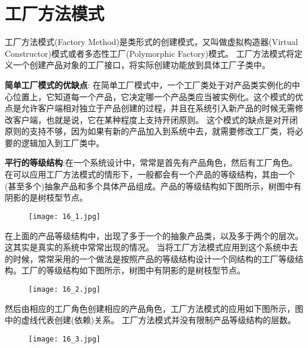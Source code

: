 \documentclass[../main.tex]{subfiles}
\begin{document}
\section{工厂方法模式}
工厂方法模式(Factory Method)是类形式的创建模式，又叫做虚拟构造器(Virtual Constructor)模式或者多态性工厂(Polymorphic Factory)模式。
工厂方法模式将定义一个创建产品对象的工厂接口，将实际创建功能放到具体工厂子类中。

\textbf{简单工厂模式的优缺点}:
在简单工厂模式中，一个工厂类处于对产品类实例化的中心位置上，它知道每一个产品，它决定哪一个产品类应当被实例化。这个模式的优点是允许客户端相对独立于产品创建的过程，并且在系统引入新产品的时候无需修改客户端，也就是说，它在某种程度上支持开闭原则。
这个模式的缺点是对开闭原则的支持不够，因为如果有新的产品加入到系统中去，就需要修改工厂类，将必要的逻辑加入到工厂类中。

\textbf{平行的等级结构}:在一个系统设计中，常常是首先有产品角色，然后有工厂角色。在可以应用工厂方法模式的情形下，一般都会有一个产品的等级结构，其由一个(甚至多个)抽象产品和多个具体产品组成。产品的等级结构如下图所示，树图中有阴影的是树枝型节点。
\begin{figure}[H]
  \texttt{[image: 16\_1.jpg]}
\end{figure}
在上面的产品等级结构中，出现了多于一个的抽象产品类，以及多于两个的层次。这其实是真实的系统中常常出现的情况。
当将工厂方法模式应用到这个系统中去的时候，常常采用的一个做法是按照产品的等级结构设计一个同结构的工厂等级结构。工厂的等级结构如下图所示，树图中有阴影的是树枝型节点。
\begin{figure}[H]
  \texttt{[image: 16\_2.jpg]}
\end{figure}
然后由相应的工厂角色创建相应的产品角色，工厂方法模式的应用如下图所示，图中的虚线代表创建(依赖)关系。
工厂方法模式并没有限制产品等级结构的层数。
\begin{figure}[H]
  \texttt{[image: 16\_3.jpg]}
\end{figure}
%
\end{document}

